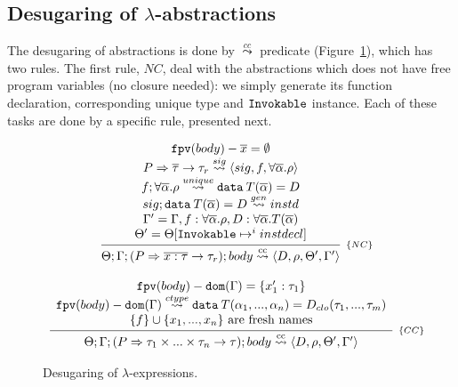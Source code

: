 \documentclass[a4paper, 11pt]{article}
\begin{document}
\subsection{Desugaring of $\lambda$-abstractions}

The desugaring of abstractions is done by $\overset{cc}{\leadsto}$ predicate (Figure~\ref{fig:closurepred}), 
which has two rules. The first rule, $NC$, deal with the abstractions which does not 
have free program variables (no closure needed): we simply generate its 
function declaration, corresponding unique type and $\mathtt{Invokable}$ instance. Each of these 
tasks are done by a specific rule, presented next. 

\begin{figure}[H]
  \[
    \begin{array}{c}
      \infer[_{\{NC\}}]
            {\Theta;\Gamma;(P \Rightarrow \overline{x : \tau} \to \tau_r); body \cc \langle D, \rho, \Theta', \Gamma' \rangle}
            {\begin{array}{c}
              \fpv(body) - \overline{x} = \emptyset\\
              P \Rightarrow \overline{\tau} \to \tau_r \sig \langle sig, f, \forall \overline{\alpha} . \rho \rangle\\ 
              f ; \forall \overline{\alpha}. \rho \unique \mathtt{data}\:T(\overline{\alpha}) = D\\
              sig ; \mathtt{data}\:T(\overline{\alpha}) = D \geninvoke instd\\ 
              \Gamma' = \Gamma, f : \forall\overline{\alpha}.\rho, D : \forall\overline{\alpha} . T(\overline{\alpha})\\
              \Theta' = \Theta [\invokable \mapsto^i instdecl]
             \end{array}}
 \\ \\
      \infer[_{\{CC\}}]
            {\Theta;\Gamma;(P \Rightarrow \tau_1\times ... \times \tau_n \to \tau); body \cc \langle D, \rho, \Theta', \Gamma' \rangle}
            {\begin{array}{c}
              \fpv(body) - \dom{\Gamma} = \{x'_1 : \tau_1\}\\ 
              \fpv(body) - \dom{\Gamma} \closuretype \mathtt{data}\:T(\alpha_1,...,\alpha_n) = D_{clo}(\tau_1,...,\tau_m)\\  
              \{f\}\cup \{x_1, ..., x_n\}\text{ are fresh names} \\
             \end{array}}
    \end{array}
  \]
  \centering
  \caption{Desugaring of $\lambda$-expressions.}
  \label{fig:closurepred}
\end{figure}
\end{document}
